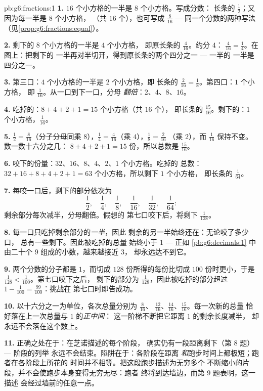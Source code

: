 \begin{solution}{pb:g6:fractions:1}
\textbf{1.} $16$ 个小方格的一半是 $8$ 个小方格。写成分数：
长条的 $\frac12$；又因为每一半是 $8$ 个小方格，
（共 $16$ 个），也可写成 $\frac{8}{16}$ --- 同一个分数的两种写法
（见\cref{prop:g6:fractions:equal}）。

\textbf{2.} 剩下的 $8$ 个小方格的一半是 $4$ 个小方格，
即原长条的 $\frac{4}{16}$。约分 $4$：
$\frac{4}{16} = \frac14$。在图上：把剩下的
一半再对半切开，得到原长条的两个四分之一 --- 一半的
一半是四分之一。

\textbf{3.} 第三口：$4$ 个小方格的一半是 $2$ 个小方格，即
长条的 $\frac{2}{16} = \frac18$。第四口：$1$ 个小方格，
即 $\frac{1}{16}$。从一口到下一口，分母
\emph{翻倍}：$2$、$4$、$8$、$16$。

\textbf{4.} 吃掉的：$8 + 4 + 2 + 1 = 15$ 个小方格（共 $16$ 个），
即长条的 $\frac{15}{16}$。剩下的：$1$ 个小方格，$\frac{1}{16}$。

\textbf{5.} $\frac12 = \frac{8}{16}$（分子分母同乘
$8$），$\frac14 = \frac{4}{16}$（乘 $4$），$\frac18 = \frac{2}{16}$
（乘 $2$），而 $\frac{1}{16}$ 保持不变。数一数十六分之几：
$8 + 4 + 2 + 1 = 15$ 份，所以总数是 $\frac{15}{16}$。

\textbf{6.} 咬下的份量：$32$、$16$、$8$、$4$、$2$、$1$ 个小方格。吃掉的
总数：$32 + 16 + 8 + 4 + 2 + 1 = 63$ 个小方格，所以剩下 $1$ 个小方格，
即长条的 $\frac{1}{64}$。

\textbf{7.} 每咬一口后，剩下的部分依次为
\[
\frac12,\quad \frac14,\quad \frac18,\quad \frac{1}{16},\quad
\frac{1}{32},\quad \frac{1}{64} :
\]
剩余部分每次减半，分母翻倍。假想的
第七口咬下后，将剩下 $\frac{1}{128}$。

\textbf{8.} 每一口只吃掉剩余部分的\emph{一半}，因此
剩余的另一半始终还在：无论咬了多少口，
总有一些剩下。因此被吃掉的总量
始终小于 $1$ --- 正如
\cref{pb:g6:decimals:1} 中由二十个 9 组成的小数，越来越接近 $3$，
却永远达不到它。

\textbf{9.} 两个分数的分子都是 $1$，而切成
$128$ 份所得的每份比切成 $100$ 份时更小，于是
$\frac{1}{128} < \frac{1}{100}$。第七口咬下之后，
剩下的部分为 $\frac{1}{128}$，因此被吃掉的部分超过
$1 - \frac{1}{100} = \frac{99}{100}$：挑战在
第七口时即告成功。

\textbf{10.} 以十六分之一为单位，各次总量分别为 $\frac{8}{16}$、
$\frac{12}{16}$、$\frac{14}{16}$、$\frac{15}{16}$。每一次新的总量
恰好落在上一次总量与 $1$ 的\emph{正中间}：
这一阶梯不断把它距离 $1$ 的剩余长度减半，
却永远不会落在这个数上。

\textbf{11.} 正确之处在于：在芝诺描述的每个阶段，
确实仍有一段距离剩下（第 8 题） --- 阶段的列举
永远不会结束。陷阱在于：各阶段在距离
\emph{和}跑步时间上都极短；跑者在各阶段上所花的
时间并不相等。把这段跑步描述为无穷多个
不断缩小的片段，并不会使跑步本身变得无穷无尽：跑者
终将到达墙边，而第 9 题表明，这一描述
会经过墙前的任意一点。


\end{solution}
